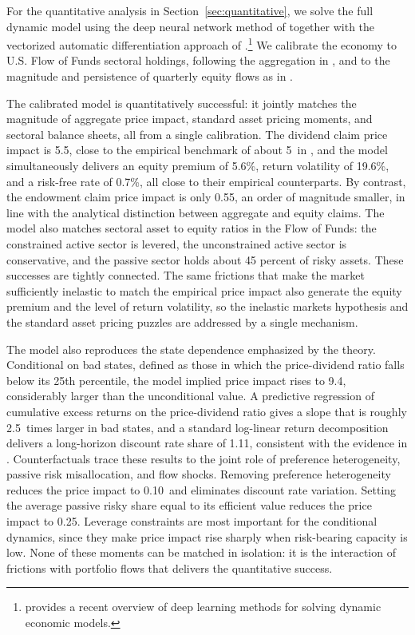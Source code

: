 \documentclass[12pt,english]{article}
\newcommand{\PIDhat}{5.5}        %
\newcommand{\PIYhat}{0.55}        %
\newcommand{\PIcondBad}{9.4}     %
\newcommand{\RPbase}{5.6\%}       %
\newcommand{\rfbase}{0.7\%}       %
\newcommand{\volbase}{19.6\%}     %
\newcommand{\betaR}{1.11}         %
\newcommand{\PIDnoHet}{0.10}      %
\newcommand{\PIDeffPassive}{0.25} %
\newcommand{\predSlopeRatio}{2.5} %
\newcommand{\PIDempirical}{5}     %
\begin{document}
For the quantitative analysis in Section~\ref{sec:quantitative}, we solve the full dynamic model using the deep neural network method of \citet{duarte2024machine} together with the vectorized automatic differentiation approach of \citet{Gopalakrishna2026}.\footnote{\citet{fernandezvillaverde2026deep} provides a recent overview of deep learning methods for solving dynamic economic models.}
We calibrate the economy to U.S. Flow of Funds sectoral holdings, following the aggregation in \citet{koijen2024investors}, and to the magnitude and persistence of quarterly equity flows as in \citet{gabaix2020search}.

The calibrated model is quantitatively successful: it jointly matches the magnitude of aggregate price impact, standard asset pricing moments, and sectoral balance sheets, all from a single calibration.
The dividend claim price impact is \PIDhat, close to the empirical benchmark of about \PIDempirical\ in \citet{gabaix2020search}, and the model simultaneously delivers an equity premium of \RPbase, return volatility of \volbase, and a risk-free rate of \rfbase, all close to their empirical counterparts.
By contrast, the endowment claim price impact is only \PIYhat, an order of magnitude smaller, in line with the analytical distinction between aggregate and equity claims.
The model also matches sectoral asset to equity ratios in the Flow of Funds: the constrained active sector is levered, the unconstrained active sector is conservative, and the passive sector holds about 45 percent of risky assets.
These successes are tightly connected.
The same frictions that make the market sufficiently inelastic to match the empirical price impact also generate the equity premium and the level of return volatility, so the inelastic markets hypothesis and the standard asset pricing puzzles are addressed by a single mechanism.

The model also reproduces the state dependence emphasized by the theory.
Conditional on bad states, defined as those in which the price-dividend ratio falls below its 25th percentile, the model implied price impact rises to \PIcondBad, considerably larger than the unconditional value.
A predictive regression of cumulative excess returns on the price-dividend ratio gives a slope that is roughly \predSlopeRatio\ times larger in bad states, and a standard log-linear return decomposition delivers a long-horizon discount rate share of \betaR, consistent with the evidence in \citet{cochrane2011presidential}.
Counterfactuals trace these results to the joint role of preference heterogeneity, passive risk misallocation, and flow shocks.
Removing preference heterogeneity reduces the price impact to \PIDnoHet\ and eliminates discount rate variation.
Setting the average passive risky share equal to its efficient value reduces the price impact to \PIDeffPassive.
Leverage constraints are most important for the conditional dynamics, since they make price impact rise sharply when risk-bearing capacity is low.
None of these moments can be matched in isolation: it is the interaction of frictions with portfolio flows that delivers the quantitative success.
\end{document}
